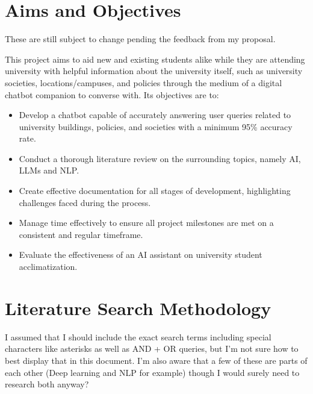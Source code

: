 \documentclass[12pt]{report}
\begin{document}
    \section{Aims and Objectives}

    \begin{tcolorbox}[colback=red!5!white,colframe=red!75!black,title=Copied from proposal]
        These are still subject to change pending the feedback from my proposal.
    \end{tcolorbox}

    This project aims to aid new and existing students alike while they are attending university with 
    helpful information about the university itself, such as university societies, locations/campuses, 
    and policies through the medium of a digital chatbot companion to converse with.
    Its objectives are to:

    \begin{itemize}
        \item Develop a chatbot capable of accurately answering user queries related to university 
        buildings, policies, and societies with a minimum 95\% accuracy rate.
        \item Conduct a thorough literature review on the surrounding topics, namely AI, LLMs and NLP.
        \item Create effective documentation for all stages of development, highlighting challenges faced during the process.
        \item Manage time effectively to ensure all project milestones are met on a consistent and regular timeframe.
        \item Evaluate the effectiveness of an AI assistant on university student acclimatization.
    \end{itemize}

    \pagebreak %

    \section{Literature Search Methodology}

    \begin{tcolorbox}[colback=yellow!5!white,colframe=yellow!75!black,title=Uncertainty - Unfinished section]
        I assumed that I should include the exact search terms including special characters
        like asterisks as well as AND + OR queries, but I'm not sure how to best display that
        in this document. I'm also aware that a few of these are parts of each other (Deep learning
        and NLP for example) though I would surely need to research both anyway?
    \end{tcolorbox}
\end{document}
